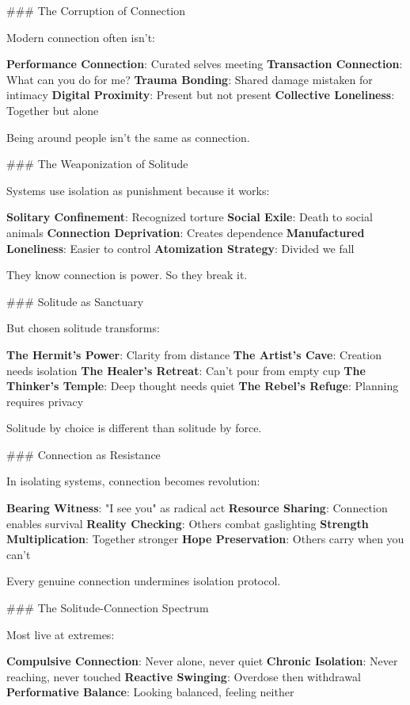 \documentclass[12pt]{book}
\begin{document}
\#\#\# The Corruption of Connection

Modern connection often isn't:

\textbf{Performance Connection}: Curated selves meeting
\textbf{Transaction Connection}: What can you do for me?
\textbf{Trauma Bonding}: Shared damage mistaken for intimacy
\textbf{Digital Proximity}: Present but not present
\textbf{Collective Loneliness}: Together but alone

Being around people isn't the same as connection.

\#\#\# The Weaponization of Solitude

Systems use isolation as punishment because it works:

\textbf{Solitary Confinement}: Recognized torture
\textbf{Social Exile}: Death to social animals
\textbf{Connection Deprivation}: Creates dependence
\textbf{Manufactured Loneliness}: Easier to control
\textbf{Atomization Strategy}: Divided we fall

They know connection is power. So they break it.

\#\#\# Solitude as Sanctuary

But chosen solitude transforms:

\textbf{The Hermit's Power}: Clarity from distance
\textbf{The Artist's Cave}: Creation needs isolation
\textbf{The Healer's Retreat}: Can't pour from empty cup
\textbf{The Thinker's Temple}: Deep thought needs quiet
\textbf{The Rebel's Refuge}: Planning requires privacy

Solitude by choice is different than solitude by force.

\#\#\# Connection as Resistance

In isolating systems, connection becomes revolution:

\textbf{Bearing Witness}: "I see you" as radical act
\textbf{Resource Sharing}: Connection enables survival
\textbf{Reality Checking}: Others combat gaslighting
\textbf{Strength Multiplication}: Together stronger
\textbf{Hope Preservation}: Others carry when you can't

Every genuine connection undermines isolation protocol.

\#\#\# The Solitude-Connection Spectrum

Most live at extremes:

\textbf{Compulsive Connection}: Never alone, never quiet
\textbf{Chronic Isolation}: Never reaching, never touched
\textbf{Reactive Swinging}: Overdose then withdrawal
\textbf{Performative Balance}: Looking balanced, feeling neither
\end{document}
